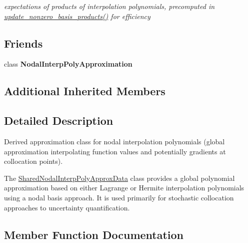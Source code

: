 \begin{DoxyCompactItemize}
\begin{DoxyCompactList}\small\item\em expectations of products of interpolation polynomials, precomputed in \hyperlink{classPecos_1_1SharedNodalInterpPolyApproxData_a7d47dcaaf6ef3a82c495a7364e891b20}{update\+\_\+nonzero\+\_\+basis\+\_\+products()} for efficiency \end{DoxyCompactList}\end{DoxyCompactItemize}
\subsection*{Friends}
\begin{DoxyCompactItemize}
\item 
class {\bfseries Nodal\+Interp\+Poly\+Approximation}\label{classPecos_1_1SharedNodalInterpPolyApproxData_a99c7b13c38f494e387170b138587e3fb}

\end{DoxyCompactItemize}
\subsection*{Additional Inherited Members}


\subsection{Detailed Description}
Derived approximation class for nodal interpolation polynomials (global approximation interpolating function values and potentially gradients at collocation points). 

The \hyperlink{classPecos_1_1SharedNodalInterpPolyApproxData}{Shared\+Nodal\+Interp\+Poly\+Approx\+Data} class provides a global polynomial approximation based on either Lagrange or Hermite interpolation polynomials using a nodal basis approach. It is used primarily for stochastic collocation approaches to uncertainty quantification. 

\subsection{Member Function Documentation}
